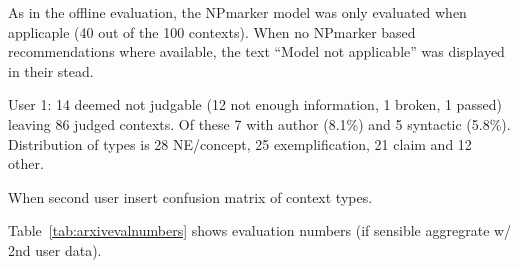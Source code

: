 As in the offline evaluation, the NPmarker model was only evaluated when applicaple (40 out of the 100 contexts). When no NPmarker based recommendations where available, the text ``Model not applicable'' was displayed in their stead.

User 1: 14 deemed not judgable (12 not enough information, 1 broken, 1 passed) leaving 86 judged contexts. Of these 7 with author (8.1\%) and 5 syntactic (5.8\%). Distribution of types is 28 NE/concept, 25 exemplification, 21 claim and 12 other.

When second user insert confusion matrix of context types.

Table~\ref{tab:arxivevalnumbers} shows evaluation numbers (if sensible aggregrate w/ 2nd user data).

